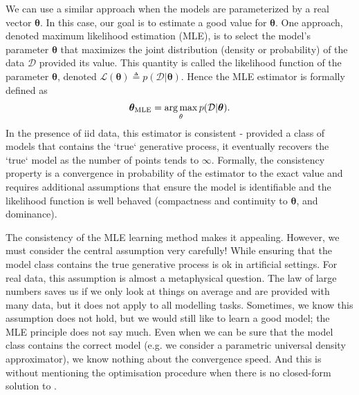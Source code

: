 We can use a similar approach when the models are parameterized by a real vector $\mathbf{\theta}$. In this case, our goal is to estimate a good value for $\mathbf{\theta}$. One approach, denoted maximum likelihood estimation (MLE), is to select the model's parameter $\mathbf{\theta}$ that maximizes the  joint distribution (density or probability) of the data $\mathcal{D}$ provided its value. This quantity is called the likelihood function of the parameter $\mathbf{\theta}$, denoted $\mathcal{L}(\mathbf{\theta}) \triangleq p(\mathcal{D}|\mathbf{\theta})$. Hence the MLE estimator is formally defined as
\begin{align}
   \bm{\theta}_{\text{MLE}} = \operatorname*{arg\,max}_{\theta} p(\mathcal{D}|\bm{\theta}). \label{eq:chap02:MLE}
\end{align}
In the presence of iid data, this estimator is consistent - provided a class of models that contains the `true` generative process, it eventually recovers the `true` model as the number of points tends to $\infty$. Formally, the consistency property is a convergence in probability of the estimator to the exact value and requires additional assumptions that ensure the model is identifiable and the likelihood function is well behaved (compactness and continuity to $\mathbf{\theta}$, and dominance).

The consistency of the MLE learning method makes it appealing. However, we must consider the central assumption very carefully! While ensuring that the model class contains the true generative process is ok in artificial settings. For real data, this assumption is almost a metaphysical question. The law of large numbers saves us if we only look at things on average and are provided with many data, but it does not apply to all modelling tasks. Sometimes, we know this assumption does not hold, but we would still like to learn a good model; the MLE principle does not say much. Even when we can be sure that the model class contains the correct model (e.g. we consider a parametric universal density approximator), we know nothing about the convergence speed. And this is without mentioning the optimisation procedure when there is no closed-form solution to .


